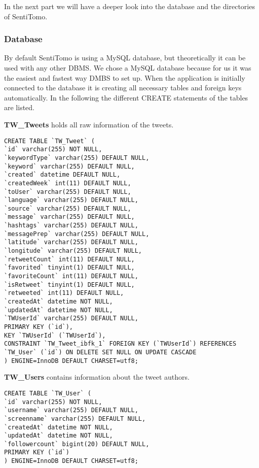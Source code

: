 \documentclass[]{article}
\begin{document}
In the next part we will have a deeper look into the database and the
directories of SentiTomo.

\subsubsection{Database}\label{database}

By default SentiTomo is using a MySQL database, but theoretically it can
be used with any other DBMS. We chose a MySQL database because for us it
was the easiest and fastest way DMBS to set up. When the application is
initially connected to the database it is creating all necessary tables
and foreign keys automatically. In the following the different CREATE
statements of the tables are listed.

\textbf{TW\_Tweets} holds all raw information of the tweets.

\begin{verbatim}
CREATE TABLE `TW_Tweet` (
`id` varchar(255) NOT NULL,
`keywordType` varchar(255) DEFAULT NULL,
`keyword` varchar(255) DEFAULT NULL,
`created` datetime DEFAULT NULL,
`createdWeek` int(11) DEFAULT NULL,
`toUser` varchar(255) DEFAULT NULL,
`language` varchar(255) DEFAULT NULL,
`source` varchar(255) DEFAULT NULL,
`message` varchar(255) DEFAULT NULL,
`hashtags` varchar(255) DEFAULT NULL,
`messagePrep` varchar(255) DEFAULT NULL,
`latitude` varchar(255) DEFAULT NULL,
`longitude` varchar(255) DEFAULT NULL,
`retweetCount` int(11) DEFAULT NULL,
`favorited` tinyint(1) DEFAULT NULL,
`favoriteCount` int(11) DEFAULT NULL,
`isRetweet` tinyint(1) DEFAULT NULL,
`retweeted` int(11) DEFAULT NULL,
`createdAt` datetime NOT NULL,
`updatedAt` datetime NOT NULL,
`TWUserId` varchar(255) DEFAULT NULL,
PRIMARY KEY (`id`),
KEY `TWUserId` (`TWUserId`),
CONSTRAINT `TW_Tweet_ibfk_1` FOREIGN KEY (`TWUserId`) REFERENCES `TW_User` (`id`) ON DELETE SET NULL ON UPDATE CASCADE
) ENGINE=InnoDB DEFAULT CHARSET=utf8;
\end{verbatim}

\textbf{TW\_Users} contains information about the tweet authors.

\begin{verbatim}
CREATE TABLE `TW_User` (
`id` varchar(255) NOT NULL,
`username` varchar(255) DEFAULT NULL,
`screenname` varchar(255) DEFAULT NULL,
`createdAt` datetime NOT NULL,
`updatedAt` datetime NOT NULL,
`followercount` bigint(20) DEFAULT NULL,
PRIMARY KEY (`id`)
) ENGINE=InnoDB DEFAULT CHARSET=utf8;
\end{verbatim}
\end{document}
